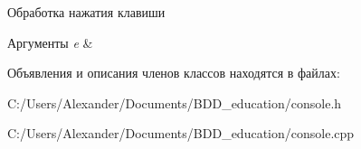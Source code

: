 Обработка нажатия клавиши 


\begin{DoxyParams}{Аргументы}
{\em e} & \\
\hline
\end{DoxyParams}


Объявления и описания членов классов находятся в файлах\+:\begin{DoxyCompactItemize}
\item 
C\+:/\+Users/\+Alexander/\+Documents/\+B\+D\+D\+\_\+education/console.\+h\item 
C\+:/\+Users/\+Alexander/\+Documents/\+B\+D\+D\+\_\+education/console.\+cpp\end{DoxyCompactItemize}

